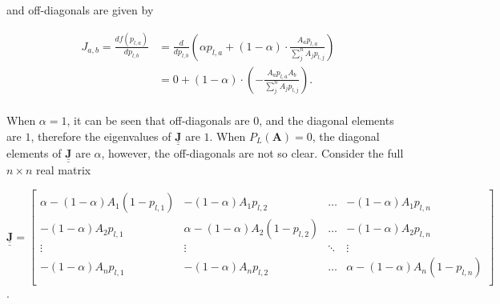 and off-diagonals are given by

\begin{align}
    J_{a,b} = \frac{d f(p_{l,a})}{d p_{l,b}} &= \frac{d}{d p_{l,b}} \left( \alpha p_{l,a} + (1 - \alpha) \cdot \frac{A_a p_{l,a}}{\sum^n_j A_j p_{l,j}} \right) \\
    &= 0 + (1 - \alpha) \cdot \left( - \frac{A_a p_{l,a} A_b}{\sum^n_j A_j p_{l,j}} \right). \\
\end{align}


When $\alpha = 1$, it can be seen that off-diagonals are $0$, and the diagonal elements are $1$, therefore the eigenvalues of $\underline{\underline{\mathbf{J}}}$ are $1$. When $P_L(\mathbf{A}) = 0$, the diagonal elements of $\underline{\underline{\mathbf{J}}}$ are $\alpha$, however, the off-diagonals are not so clear. Consider the full $n \times n$ real matrix

\begin{center}
$\underline{\underline{\mathbf{J}}} = \begin{bmatrix}
    \alpha - (1 - \alpha) A_1 (1- p_{l,1}) & - (1 - \alpha) A_1 p_{l,2} & \dots  & -(1 - \alpha) A_1 p_{l,n} \\
    - (1 - \alpha) A_2 p_{l,1} &  \alpha - (1 - \alpha) A_2 (1- p_{l,2}) &  \dots  & -(1 - \alpha) A_2 p_{l,n} \\
    \vdots & \vdots & \ddots & \vdots \\
    - (1 - \alpha) A_n p_{l,1} & - (1 - \alpha ) A_n p_{l,2} &  \dots & \alpha - (1 - \alpha) A_n (1- p_{l,n}) \\

\end{bmatrix}$.
\end{center}

